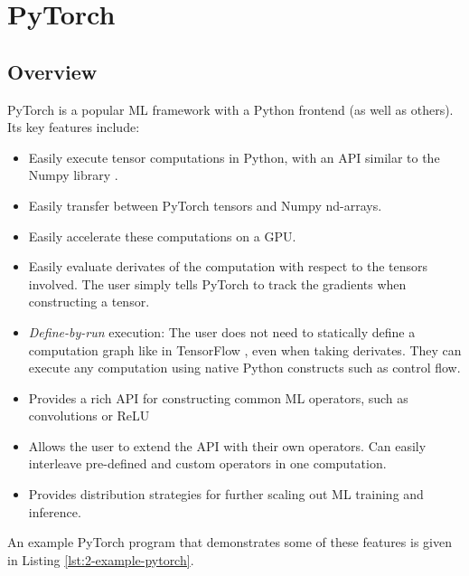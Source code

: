 \clearpage
\section{PyTorch}
\subsection{Overview}
PyTorch \cite{Paszke2017} is a popular ML framework with a Python frontend (as well as others).
Its key features include:
\begin{itemize}[topsep=0.2em, parsep=0.5\parskip]
    \item Easily execute tensor computations in Python, with an API similar to the Numpy library \cite{VanDerWalt2011}.
    \item Easily transfer between PyTorch tensors and Numpy nd-arrays.
    \item Easily accelerate these computations on a GPU.
    \item Easily evaluate derivates of the computation with respect to the tensors involved.
    The user simply tells PyTorch to track the gradients when constructing a tensor.
    \item \textit{Define-by-run} execution: The user does not need to statically define a computation graph like in TensorFlow \cite{tensorflow2015-whitepaper}, even when taking derivates.
    They can execute any computation using native Python constructs such as control flow.
    \item Provides a rich API for constructing common ML operators, such as convolutions or ReLU
    \item Allows the user to extend the API with their own operators.
    Can easily interleave pre-defined and custom operators in one computation.
    \item Provides distribution strategies for further scaling out ML training and inference.
\end{itemize}

An example PyTorch program that demonstrates some of these features is given in Listing \ref{lst:2-example-pytorch}.

\vfill


